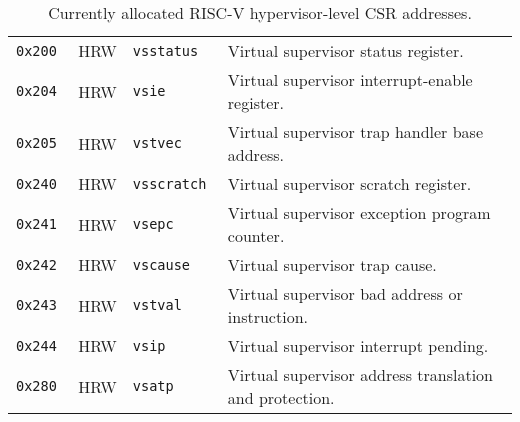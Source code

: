 \begin{table}[htb!]
\begin{center}
\begin{tabular}{|l|l|l|l|}
\hline
\tt 0x200 & HRW  &\tt vsstatus   & Virtual supervisor status register. \\
\tt 0x204 & HRW  &\tt vsie       & Virtual supervisor interrupt-enable register. \\
\tt 0x205 & HRW  &\tt vstvec     & Virtual supervisor trap handler base address. \\
\tt 0x240 & HRW  &\tt vsscratch  & Virtual supervisor scratch register. \\
\tt 0x241 & HRW  &\tt vsepc      & Virtual supervisor exception program counter. \\
\tt 0x242 & HRW  &\tt vscause    & Virtual supervisor trap cause. \\
\tt 0x243 & HRW  &\tt vstval     & Virtual supervisor bad address or instruction. \\
\tt 0x244 & HRW  &\tt vsip       & Virtual supervisor interrupt pending. \\
\tt 0x280 & HRW  &\tt vsatp      & Virtual supervisor address translation and protection. \\
\hline
\end{tabular}
\end{center}
\caption{Currently allocated RISC-V hypervisor-level CSR addresses.}
\label{hcsrnames}
\end{table}


